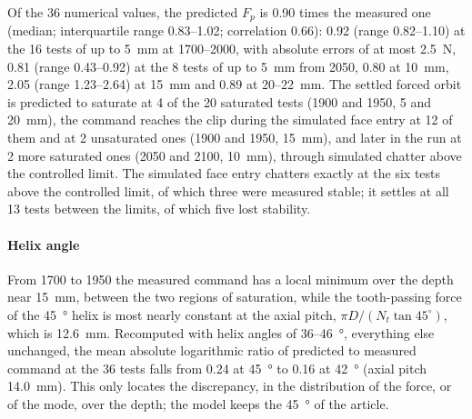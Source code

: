 Of the 36 numerical values, the predicted $F_p$ is 0.90 times the measured one (median; interquartile range 0.83--1.02; correlation 0.66): 0.92 (range 0.82--1.10) at the 16 tests of up to \SI{5}{\milli\metre} at 1700--\SI{2000}{\rpm}, with absolute errors of at most \SI{2.5}{\newton}, 0.81 (range 0.43--0.92) at the 8 tests of up to \SI{5}{\milli\metre} from \SI{2050}{\rpm}, 0.80 at \SI{10}{\milli\metre}, 2.05 (range 1.23--2.64) at \SI{15}{\milli\metre} and 0.89 at 20--\SI{22}{\milli\metre}. The settled forced orbit is predicted to saturate at 4 of the 20 saturated tests (1900 and \SI{1950}{\rpm}, 5 and \SI{20}{\milli\metre}), the command reaches the clip during the simulated face entry at 12 of them and at 2 unsaturated ones (1900 and \SI{1950}{\rpm}, \SI{15}{\milli\metre}), and later in the run at 2 more saturated ones (2050 and \SI{2100}{\rpm}, \SI{10}{\milli\metre}), through simulated chatter above the controlled limit. The simulated face entry chatters exactly at the six tests above the controlled limit, of which three were measured stable; it settles at all 13 tests between the limits, of which five lost stability.

\paragraph{Helix angle} From 1700 to \SI{1950}{\rpm} the measured command has a local minimum over the depth near \SI{15}{\milli\metre}, between the two regions of saturation, while the tooth-passing force of the \SI{45}{\degree} helix is most nearly constant at the axial pitch, $\pi D/(N_t\tan45^\circ)$, which is \SI{12.6}{\milli\metre}. Recomputed with helix angles of 36--\SI{46}{\degree}, everything else unchanged, the mean absolute logarithmic ratio of predicted to measured command at the 36 tests falls from 0.24 at \SI{45}{\degree} to 0.16 at \SI{42}{\degree} (axial pitch \SI{14.0}{\milli\metre}). This only locates the discrepancy, in the distribution of the force, or of the mode, over the depth; the model keeps the \SI{45}{\degree} of the article.

